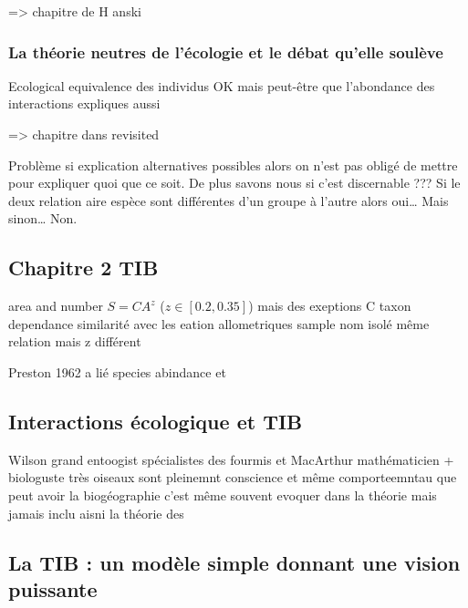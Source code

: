 =\textgreater{} chapitre de H anski

\subsubsection{La théorie neutres de l'écologie et le débat qu'elle
soulève}\label{la-thuxe9orie-neutres-de-luxe9cologie-et-le-duxe9bat-quelle-souluxe8ve}

Ecological equivalence des individus OK mais peut-être que l'abondance
des interactions expliques aussi

=\textgreater{} chapitre dans revisited

Problème si explication alternatives possibles alors on n'est pas obligé
de mettre pour expliquer quoi que ce soit. De plus savons nous si c'est
discernable ??? Si le deux relation aire espèce sont différentes d'un
groupe à l'autre alors oui\ldots{} Mais sinon\ldots{} Non.

\subsection{Chapitre 2 TIB}\label{chapitre-2-tib}

area and number \(S=CA^z\) (\(z \in [0.2,0.35]\)) mais des exeptions C
taxon dependance similarité avec les eation allometriques sample nom
isolé même relation mais z différent

Preston 1962 a lié species abindance et

\subsection{Interactions écologique et
TIB}\label{interactions-uxe9cologique-et-tib}

Wilson grand entoogist spécialistes des fourmis et MacArthur
mathématicien + biologuste très oiseaux sont pleinemnt conscience et
même comporteemntau que peut avoir la biogéographie c'est même souvent
evoquer dans la théorie mais jamais inclu aisni la théorie des

\subsection{La TIB : un modèle simple donnant une vision
puissante}\label{la-tib-un-moduxe8le-simple-donnant-une-vision-puissante}

